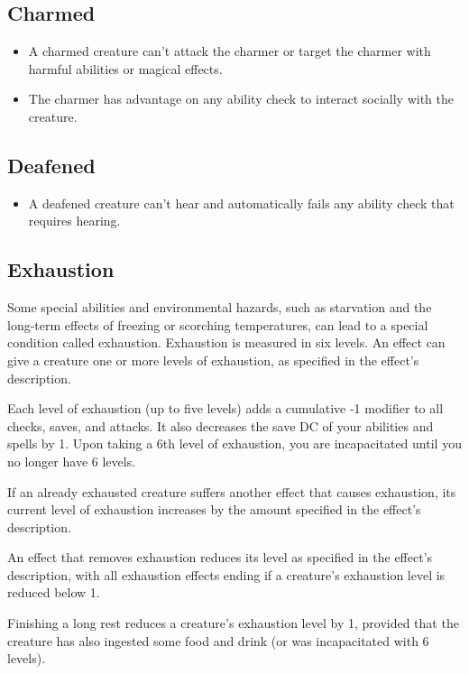 \subsection{Charmed\label{condition:charmed}}
\begin{itemize}
\item A charmed creature can't attack the charmer or target the charmer with harmful abilities or magical effects.
\item The charmer has advantage on any ability check to interact socially with the creature.
\end{itemize}

\subsection{Deafened\label{condition:deafened}}
\begin{itemize}
\item A deafened creature can't hear and automatically fails any ability check that requires hearing.
\end{itemize}

\subsection{Exhaustion\label{condition:exhaustion}}

Some special abilities and environmental hazards, such as starvation and the long-term effects of freezing or scorching temperatures, can lead to a special condition called exhaustion. Exhaustion is measured in six levels. An effect can give a creature one or more levels of exhaustion, as specified in the effect's description.

Each level of exhaustion (up to five levels) adds a cumulative -1 modifier to all checks, saves, and attacks. It also decreases the save DC of your abilities and spells by 1. Upon taking a 6th level of exhaustion, you are incapacitated until you no longer have 6 levels.

If an already exhausted creature suffers another effect that causes exhaustion, its current level of exhaustion increases by the amount specified in the effect's description.

An effect that removes exhaustion reduces its level as specified in the effect's description, with all exhaustion effects ending if a creature's exhaustion level is reduced below 1.

Finishing a long rest reduces a creature's exhaustion level by 1, provided that the creature has also ingested some food and drink (or was incapacitated with 6 levels).

